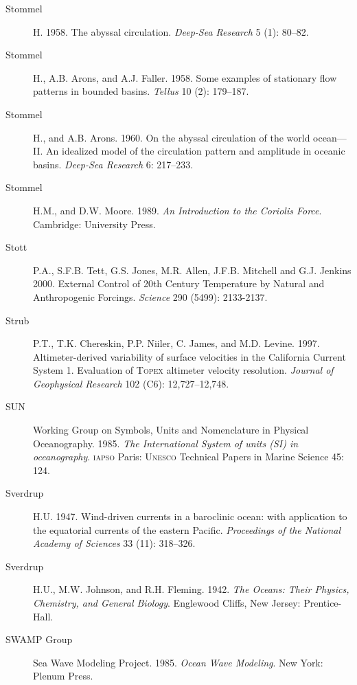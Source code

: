 \begin{description}
\item[Stommel]H. 1958. The abyssal circulation. \textit{Deep-Sea
  Research} 5 (1): 80--82.

\item [Stommel]H., A.B. Arons, and A.J. Faller. 1958. Some examples of
  stationary flow patterns in bounded basins. \textit{Tellus} 10 (2):
  179--187.

\item [Stommel]H., and A.B. Arons. 1960. On the abyssal circulation of
  the world ocean---II. An idealized model of the circulation pattern
  and amplitude in oceanic basins. \textit{Deep-Sea Research} 6:
  217--233.

\item [Stommel]H.M., and D.W. Moore. 1989. \textit{An Introduction to
  the Coriolis Force}.  Cambridge: University Press.

\item [Stott]P.A., S.F.B. Tett, G.S. Jones, M.R. Allen,
  J.F.B. Mitchell and G.J. Jenkins 2000. External Control of 20th
  Century Temperature by Natural and Anthropogenic
  Forcings. \textit{Science} 290 (5499): 2133-2137.

\item [Strub]P.T., T.K. Chereskin, P.P. Niiler, C. James, and
  M.D. Levine.  1997. Altimeter-derived variability of surface
  velocities in the California Current System 1. Evaluation of
  \textsc{Topex} altimeter velocity resolution.  \textit{Journal of
    Geophysical Research} 102 (C6): 12,727--12,748.

\item [SUN]Working Group on Symbols, Units and Nomenclature in
  Physical Oceanography. 1985. \textit{The International System of
    units (SI) in oceanography}. \textsc{iapso} Paris: \textsc{Unesco}
  Technical Papers in Marine Science 45: 124.

\item [Sverdrup]H.U. 1947. Wind-driven currents in a baroclinic ocean:
  with application to the equatorial currents of the eastern Pacific.
  \textit{Proceedings of the National Academy of Sciences} 33 (11):
  318--326.

\item [Sverdrup]H.U., M.W. Johnson, and
  R.H. Fleming. 1942. \textit{The Oceans: Their Physics, Chemistry,
    and General Biology}.  Englewood Cliffs, New Jersey:
  Prentice-Hall.

\item [SWAMP Group]Sea Wave Modeling Project. 1985. \textit{Ocean Wave
  Modeling}. New York: Plenum Press.


\end{description}
